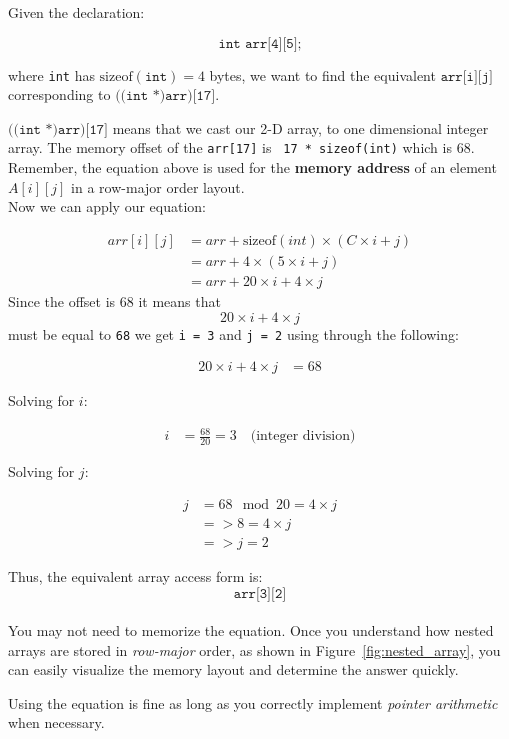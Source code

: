 \documentclass{article}
\begin{document}
Given the declaration:

\[
\texttt{int arr[4][5];}
\]

where \texttt{int} has \(\text{sizeof}(\texttt{int}) = 4\) bytes, we want to find the equivalent \(\texttt{arr[i][j]}\) corresponding to \(\texttt{((int *)arr)[17]}\).

\(\texttt{((int *)arr)[17]}\) means that we cast our 2-D array, to one dimensional integer array. The memory offset of the \texttt{arr[17]} is \texttt{ 17 * sizeof(int)} which is 68. Remember, the equation above is used for the \textbf{memory address} of an element \( A[i][j] \) in a row-major order layout.\\
Now we can apply our equation:

\begin{align*}
arr[i][j] &= arr + \text{sizeof}(int) \times (C \times i + j) \\
        &= arr + 4 \times (5 \times i + j) \\
        &= arr + 20 \times i + 4 \times j
\end{align*}
Since the offset is 68 it means that \[
20 \times i + 4 \times j
\] 
must be equal to \texttt{68} we get \texttt{i = 3} and \texttt{j = 2} using through the following: 

\begin{align*}
20 \times i + 4 \times j &= 68
\end{align*}

Solving for \( i \):

\begin{align*}
i &= \frac{68}{20} = 3 \quad \text{(integer division)}
\end{align*}

Solving for \( j \):

\begin{align*}
j &= 68 \mod 20 = 4 \times j \\
  &=> 8 = 4 \times j \\
  &=> j = 2
\end{align*}

Thus, the equivalent array access form is:
\[
\texttt{arr[3][2]}
\]
\\
You may not need to memorize the equation. Once you understand how nested arrays are stored in \textit{row-major} order, as shown in Figure~\ref{fig:nested_array}, you can easily visualize the memory layout and determine the answer quickly. 

Using the equation is fine as long as you correctly implement \textit{pointer arithmetic} when necessary.
\end{document}
